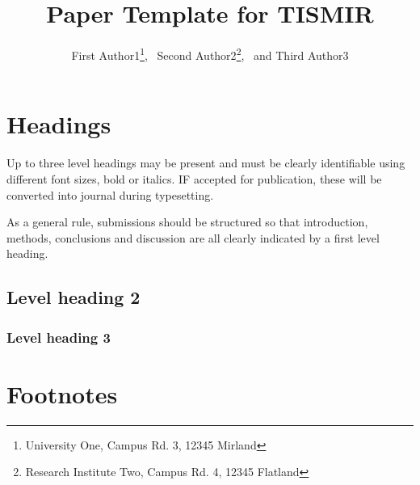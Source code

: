 \documentclass{article}
\title{Paper Template for TISMIR}
\author{%
First Author1\thanks{University One, Campus Rd. 3, 12345 Mirland},%
~Second Author2\thanks{Research Institute Two, Campus Rd. 4, 12345 Flatland},%
~and Third Author3\protect\footnotemark[1]}
\date{}
\begin{document}

\saythanks{}


\section{Headings}\label{sec:headings}

Up to three level headings may be present and must be clearly identifiable
using different font sizes, bold or italics. IF accepted for publication,
these will be converted into journal during typesetting.

As a general rule, submissions should be structured so that introduction,
methods, conclusions and discussion are all clearly indicated by a first level heading.

\subsection{Level heading 2}

\lipsum[66]

\subsubsection{Level heading 3}

\lipsum[75]

\section{Footnotes}\label{sec:footnotes}
\end{document}
